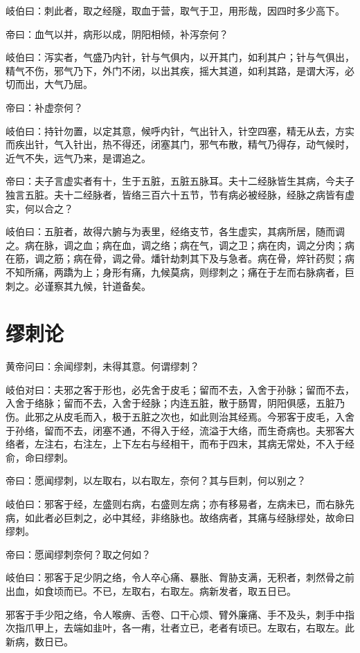 \documentclass{article}%
\begin{document}
岐伯曰：刺此者，取之经隧，取血于营，取气于卫，用形哉，因四时多少高下。

帝曰：血气以并，病形以成，阴阳相倾，补泻奈何？

岐伯曰：泻实者，气盛乃内针，针与气俱内，以开其门，如利其户；针与气俱出，精气不伤，邪气乃下，外门不闭，以出其疾，摇大其道，如利其路，是谓大泻，必切而出，大气乃屈。

帝曰：补虚奈何？

岐伯曰：持针勿置，以定其意，候呼内针，气出针入，针空四塞，精无从去，方实而疾出针，气入针出，热不得还，闭塞其门，邪气布散，精气乃得存，动气候时，近气不失，远气乃来，是谓追之。

帝曰：夫子言虚实者有十，生于五脏，五脏五脉耳。夫十二经脉皆生其病，今夫子独言五脏。夫十二经脉者，皆络三百六十五节，节有病必被经脉，经脉之病皆有虚实，何以合之？

岐伯曰：五脏者，故得六腑与为表里，经络支节，各生虚实，其病所居，随而调之。病在脉，调之血；病在血，调之络；病在气，调之卫；病在肉，调之分肉；病在筋，调之筋；病在骨，调之骨。燔针劫刺其下及与急者。病在骨，焠针药熨；病不知所痛，两蹻为上；身形有痛，九候莫病，则缪刺之；痛在于左而右脉病者，巨刺之。必谨察其九候，针道备矣。
\section{缪刺论}
黄帝问曰：余闻缪刺，未得其意。何谓缪刺？

岐伯对曰：夫邪之客于形也，必先舍于皮毛；留而不去，入舍于孙脉；留而不去，入舍于络脉；留而不去，入舍于经脉；内连五脏，散于肠胃，阴阳俱感，五脏乃伤。此邪之从皮毛而入，极于五脏之次也，如此则治其经焉。今邪客于皮毛，入舍于孙络，留而不去，闭塞不通，不得入于经，流溢于大络，而生奇病也。夫邪客大络者，左注右，右注左，上下左右与经相干，而布于四末，其病无常处，不入于经俞，命曰缪刺。

帝曰：愿闻缪刺，以左取右，以右取左，奈何？其与巨刺，何以别之？

岐伯曰：邪客于经，左盛则右病，右盛则左病；亦有移易者，左病未已，而右脉先病，如此者必巨刺之，必中其经，非络脉也。故络病者，其痛与经脉缪处，故命曰缪刺。

帝曰：愿闻缪刺奈何？取之何如？

岐伯曰：邪客于足少阴之络，令人卒心痛、暴胀、胷胁支满，无积者，刺然骨之前出血，如食顷而已。不已，左取右，右取左。病新发者，取五日已。

邪客于手少阳之络，令人喉痹、舌卷、口干心烦、臂外廉痛、手不及头，刺手中指次指爪甲上，去端如韭叶，各一痏，壮者立已，老者有顷已。左取右，右取左。此新病，数日已。
\end{document}

